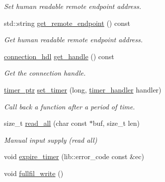 \begin{DoxyCompactItemize}
\begin{DoxyCompactList}\small\item\em Set human readable remote endpoint address. \end{DoxyCompactList}\item 
std\+::string \hyperlink{classwebsocketpp_1_1transport_1_1debug_1_1connection_af568bd0c6b4335d453931189dc9080cd}{get\+\_\+remote\+\_\+endpoint} () const 
\begin{DoxyCompactList}\small\item\em Get human readable remote endpoint address. \end{DoxyCompactList}\item 
\hyperlink{namespacewebsocketpp_a6b3d26a10ee7229b84b776786332631d}{connection\+\_\+hdl} \hyperlink{classwebsocketpp_1_1transport_1_1debug_1_1connection_a38e1d127c3a75f6f86602e79e7c7c977}{get\+\_\+handle} () const 
\begin{DoxyCompactList}\small\item\em Get the connection handle. \end{DoxyCompactList}\item 
\hyperlink{classwebsocketpp_1_1transport_1_1debug_1_1connection_a92ac093c337944c0d17422b090cc1e62}{timer\+\_\+ptr} \hyperlink{classwebsocketpp_1_1transport_1_1debug_1_1connection_a56b96fed344bafbbb0453997dbf54f40}{set\+\_\+timer} (long, \hyperlink{namespacewebsocketpp_1_1transport_a946cc56ff41139f3002149c15fd87bc9}{timer\+\_\+handler} handler)
\begin{DoxyCompactList}\small\item\em Call back a function after a period of time. \end{DoxyCompactList}\item 
size\+\_\+t \hyperlink{classwebsocketpp_1_1transport_1_1debug_1_1connection_a36a7e0c517495dd8bdbecfa75c5a9d7b}{read\+\_\+all} (char const $\ast$buf, size\+\_\+t len)
\begin{DoxyCompactList}\small\item\em Manual input supply (read all) \end{DoxyCompactList}\item 
void \hyperlink{classwebsocketpp_1_1transport_1_1debug_1_1connection_a05593a3cbd005194ea0e822631d629ce}{expire\+\_\+timer} (lib\+::error\+\_\+code const \&ec)
\item 
void \hyperlink{classwebsocketpp_1_1transport_1_1debug_1_1connection_a53d8858b47eeccbd9d8bfd8b8e4f4a9a}{fullfil\+\_\+write} ()
\end{DoxyCompactItemize}
